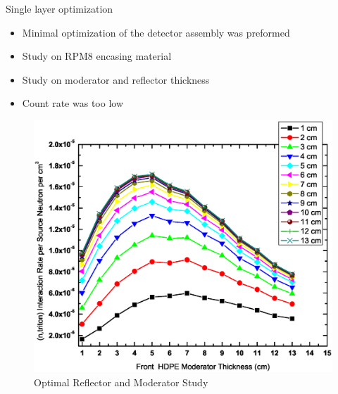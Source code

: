 \begin{frame}{Single layer optimization}
	\tiny
	\begin{itemize}
		\item Minimal optimization of the detector assembly was preformed
		\item Study on RPM8 encasing material
		\item Study on moderator and reflector thickness
		\item Count rate was too low
	\end{itemize}
	\begin{figure}
		\centering
		\includegraphics[height=0.5\textheight]{images/PS_50um_30LiF-InteractionRate-ShieldThickness.eps}
		\tiny \caption{Optimal Reflector and Moderator Study}
	\end{figure}
\end{frame}
